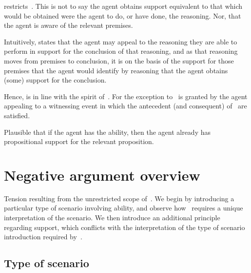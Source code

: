\begin{note}[Alternative]
  \rC{} restricts~\uRa{}.
  This is not to say the agent obtains support equivalent to that which would be obtained were the agent to do, or have done, the reasoning.
  Nor, that the agent is aware of the relevant premises.

  Intuitively, \rC{} states that the agent may appeal to the reasoning they are able to perform in support for the conclusion of that reasoning, and as that reasoning moves from premises to conclusion, it is on the basis of the support for those premises that the agent would identify by reasoning that the agent obtains (some) support for the conclusion.

  Hence, \rC{} is in line with the spirit of~\bP{}.
  For the exception to~\uRa{} is granted by the agent appealing to a witnessing event in which the antecedent (and consequent) of~\bP{} are satisfied.
\end{note}

\begin{note}
  Plausible that if the agent has the ability, then the agent already has propositional support for the relevant proposition.
\end{note}

\section{Negative argument overview}
\label{sec:broad-argum-overv}

\begin{note}[Overview]
  Tension resulting from the unrestricted scope of~\uRa{}.
  We begin by introducing a particular type of scenario involving ability, and observe how~\uRa{} requires a unique interpretation of the scenario.
  We then introduce an additional principle regarding support, which conflicts with the interpretation of the type of scenario introduction required by~\uRa{}.
\end{note}

\subsection{Type of scenario}
\label{sec:type-scenario}

